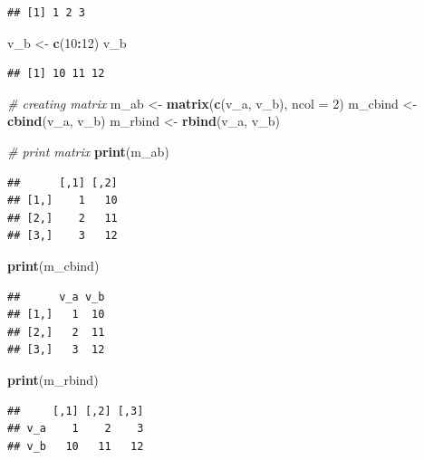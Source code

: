 \documentclass[
  12pt,
  oneside]{book}
\newenvironment{Shaded}{\begin{snugshade}}{\end{snugshade}}
\newcommand{\AttributeTok}[1]{\textcolor[rgb]{0.13,0.29,0.53}{#1}}
\newcommand{\CommentTok}[1]{\textcolor[rgb]{0.56,0.35,0.01}{\textit{#1}}}
\newcommand{\DecValTok}[1]{\textcolor[rgb]{0.00,0.00,0.81}{#1}}
\newcommand{\FunctionTok}[1]{\textcolor[rgb]{0.13,0.29,0.53}{\textbf{#1}}}
\newcommand{\NormalTok}[1]{#1}
\newcommand{\OtherTok}[1]{\textcolor[rgb]{0.56,0.35,0.01}{#1}}
\newcommand{\SpecialCharTok}[1]{\textcolor[rgb]{0.81,0.36,0.00}{\textbf{#1}}}
\theoremstyle{definition}
\theoremstyle{definition}
\theoremstyle{definition}
\theoremstyle{definition}
\theoremstyle{remark}
\begin{document}
\begin{verbatim}
## [1] 1 2 3
\end{verbatim}

\begin{Shaded}
\begin{Highlighting}[]
\NormalTok{v\_b }\OtherTok{\textless{}{-}} \FunctionTok{c}\NormalTok{(}\DecValTok{10}\SpecialCharTok{:}\DecValTok{12}\NormalTok{)}
\NormalTok{v\_b}
\end{Highlighting}
\end{Shaded}

\begin{verbatim}
## [1] 10 11 12
\end{verbatim}

\begin{Shaded}
\begin{Highlighting}[]
\CommentTok{\# creating matrix}
\NormalTok{m\_ab }\OtherTok{\textless{}{-}} \FunctionTok{matrix}\NormalTok{(}\FunctionTok{c}\NormalTok{(v\_a, v\_b), }\AttributeTok{ncol =} \DecValTok{2}\NormalTok{)}
\NormalTok{m\_cbind }\OtherTok{\textless{}{-}} \FunctionTok{cbind}\NormalTok{(v\_a, v\_b)}
\NormalTok{m\_rbind }\OtherTok{\textless{}{-}} \FunctionTok{rbind}\NormalTok{(v\_a, v\_b)}

\CommentTok{\# print matrix}
\FunctionTok{print}\NormalTok{(m\_ab)}
\end{Highlighting}
\end{Shaded}

\begin{verbatim}
##      [,1] [,2]
## [1,]    1   10
## [2,]    2   11
## [3,]    3   12
\end{verbatim}

\begin{Shaded}
\begin{Highlighting}[]
\FunctionTok{print}\NormalTok{(m\_cbind)}
\end{Highlighting}
\end{Shaded}

\begin{verbatim}
##      v_a v_b
## [1,]   1  10
## [2,]   2  11
## [3,]   3  12
\end{verbatim}

\begin{Shaded}
\begin{Highlighting}[]
\FunctionTok{print}\NormalTok{(m\_rbind)}
\end{Highlighting}
\end{Shaded}

\begin{verbatim}
##     [,1] [,2] [,3]
## v_a    1    2    3
## v_b   10   11   12
\end{verbatim}
\end{document}
